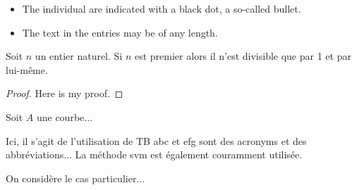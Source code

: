   

\begin{itemize}
	\item The individual  are indicated with a black dot, a so-called bullet.
	\item The text in the entries may be of any length.
\end{itemize}

\begin{theorem}\label{theo1}
Soit $n$ un entier naturel. Si $n$ est premier alors il n'est divisible que par 1 et par lui-même.
\end{theorem}

\begin{proof}
Here is my proof.
\end{proof}

\begin{definition}\label{def1}
Soit $A$ une courbe...
\end{definition}

Ici, il s'agit de l'utilisation de TB %
\gls{abc} et \gls{efg} sont des acronyms et des abbréviations... La méthode \gls{svm} est également couramment utilisée.

\begin{exemple}\label{exo1}
On considère le cas particulier... 
\end{exemple}